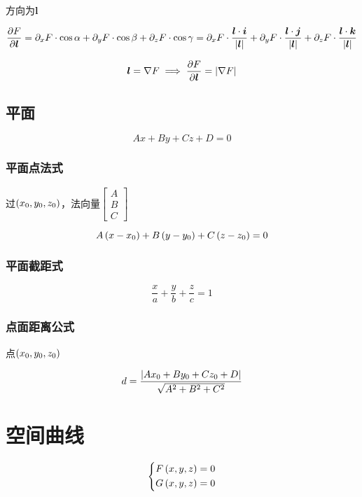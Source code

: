 \documentclass{article}
\begin{document}
方向为$\boldsymbol l$

\[\frac{\partial F}{\partial\boldsymbol l}
    =\partial_xF\cdot\cos\alpha+\partial_yF\cdot\cos\beta+\partial_zF\cdot\cos\gamma
    =\partial_xF\cdot\frac{\boldsymbol l\cdot\boldsymbol i}{\left|\boldsymbol l\right|}
    +\partial_yF\cdot\frac{\boldsymbol l\cdot\boldsymbol j}{\left|\boldsymbol l\right|}
    +\partial_zF\cdot\frac{\boldsymbol l\cdot\boldsymbol k}{\left|\boldsymbol l\right|}\]

\[\boldsymbol l=\nabla F\implies\frac{\partial F}{\partial\boldsymbol l}=\left|\nabla F\right|\]

\subsection{平面}

\begin{definition}[]
    \[Ax+By+Cz+D=0\]
\end{definition}

\subsubsection{平面点法式}

过$\left(x_0,y_0,z_0\right)$，法向量$\begin{bmatrix}A\\B\\C\end{bmatrix}$

\[A\left(x-x_0\right)+
    B\left(y-y_0\right)+
    C\left(z-z_0\right)=0\]

\subsubsection{平面截距式}

\[\frac xa+\frac yb+\frac zc=1\]

\subsubsection{点面距离公式}

点$\left(x_0,y_0,z_0\right)$

\[d=\frac{\left|Ax_0+By_0+Cz_0+D\right|}{\sqrt{A^2+B^2+C^2}}\]

\section{空间曲线}

\begin{definition}[]
    \[\left\{\begin{aligned}
            F\left(x,y,z\right) & =0 \\
            G\left(x,y,z\right) & =0
        \end{aligned}\right.\]
\end{definition}
\end{document}
